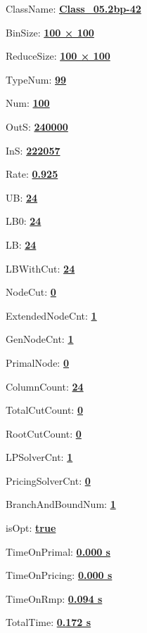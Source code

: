 \documentclass[11pt]{article}
\begin{document}
\pagestyle{empty}


ClassName: \underline{\textbf{Class_05.2bp-42}}
\par
BinSize: \underline{\textbf{100 × 100}}
\par
ReduceSize: \underline{\textbf{100 × 100}}
\par
TypeNum: \underline{\textbf{99}}
\par
Num: \underline{\textbf{100}}
\par
OutS: \underline{\textbf{240000}}
\par
InS: \underline{\textbf{222057}}
\par
Rate: \underline{\textbf{0.925}}
\par
UB: \underline{\textbf{24}}
\par
LB0: \underline{\textbf{24}}
\par
LB: \underline{\textbf{24}}
\par
LBWithCut: \underline{\textbf{24}}
\par
NodeCut: \underline{\textbf{0}}
\par
ExtendedNodeCnt: \underline{\textbf{1}}
\par
GenNodeCnt: \underline{\textbf{1}}
\par
PrimalNode: \underline{\textbf{0}}
\par
ColumnCount: \underline{\textbf{24}}
\par
TotalCutCount: \underline{\textbf{0}}
\par
RootCutCount: \underline{\textbf{0}}
\par
LPSolverCnt: \underline{\textbf{1}}
\par
PricingSolverCnt: \underline{\textbf{0}}
\par
BranchAndBoundNum: \underline{\textbf{1}}
\par
isOpt: \underline{\textbf{true}}
\par
TimeOnPrimal: \underline{\textbf{0.000 s}}
\par
TimeOnPricing: \underline{\textbf{0.000 s}}
\par
TimeOnRmp: \underline{\textbf{0.094 s}}
\par
TotalTime: \underline{\textbf{0.172 s}}
\par
\newpage


\end{document}
